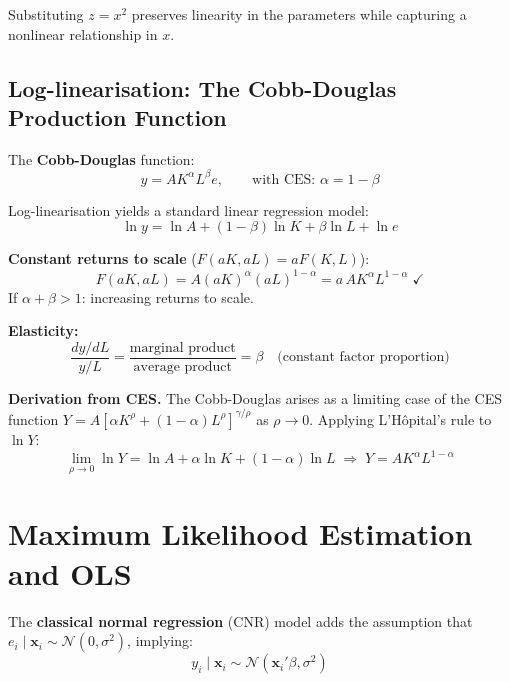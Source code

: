Substituting $z = x^2$ preserves linearity in the parameters while capturing
a nonlinear relationship in $x$.

\subsection{Log-linearisation: The Cobb-Douglas Production Function}

The \textbf{Cobb-Douglas} function:
\begin{equation}
  y = AK^\alpha L^\beta e, \qquad\text{with CES: }\alpha = 1-\beta
\end{equation}

Log-linearisation yields a standard linear regression model:
\begin{equation}
  \ln y = \ln A + (1-\beta)\ln K + \beta\ln L + \ln e
\end{equation}

\noindent\textbf{Constant returns to scale} ($F(aK,aL) = aF(K,L)$):
\begin{equation}
  F(aK,aL) = A(aK)^\alpha(aL)^{1-\alpha} = a\,AK^\alpha L^{1-\alpha}
  \;\checkmark
\end{equation}
If $\alpha + \beta > 1$: increasing returns to scale.

\noindent\textbf{Elasticity:}
\begin{equation}
  \frac{dy/dL}{y/L}
  = \frac{\text{marginal product}}{\text{average product}}
  = \beta \quad\text{(constant factor proportion)}
\end{equation}

\noindent\textbf{Derivation from CES.} The Cobb-Douglas arises as a limiting
case of the CES function $Y = A[\alpha K^\rho + (1-\alpha)L^\rho]^{\gamma/\rho}$
as $\rho \to 0$. Applying L'H\^opital's rule to $\ln Y$:
\begin{equation}
  \lim_{\rho\to0}\ln Y = \ln A + \alpha\ln K + (1-\alpha)\ln L
  \;\Longrightarrow\; Y = AK^\alpha L^{1-\alpha}
\end{equation}


\section{Maximum Likelihood Estimation and OLS}
\label{sec_MLE}

The \textbf{classical normal regression} (CNR) model adds the assumption that
$e_i \mid \mathbf{x}_i \sim \mathcal{N}(0, \sigma^2)$, implying:
\begin{equation}
  y_i \mid \mathbf{x}_i \sim \mathcal{N}(\mathbf{x}_i'\beta, \sigma^2)
\end{equation}

